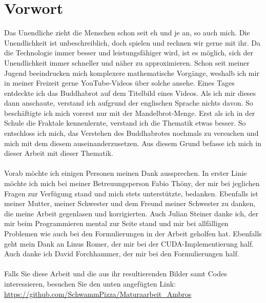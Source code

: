 \section*{Vorwort}
Das Unendliche zieht die Menschen schon seit eh und je an, so auch mich. Die Unendlichkeit ist unbeschreiblich, doch spielen und rechnen wir gerne mit ihr. Da die Technologie immer besser und leistungsfähiger wird, ist es möglich, sich der Unendlichkeit immer schneller und näher zu approximieren. Schon seit meiner Jugend beeindrucken mich komplexere mathematische Vorgänge, weshalb ich mir in meiner Freizeit gerne YouTube-Videos über solche ansehe. Eines Tages entdeckte ich das Buddhabrot auf dem Titelbild eines Videos. Als ich mir dieses dann anschaute, verstand ich aufgrund der englischen Sprache nichts davon. So beschäftigte ich mich vorerst nur mit der Mandelbrot-Menge. Erst als ich in der Schule die Fraktale kennenlernte, verstand ich die Thematik etwas besser. So entschloss ich mich, das Verstehen des Buddhabrotes nochmals zu versuchen und mich mit dem diesem auseinanderzusetzen. Aus diesem Grund befasse ich mich in dieser Arbeit mit dieser Thematik.\\
\\
Vorab möchte ich einigen Personen meinen Dank aussprechen. In erster Linie möchte ich mich bei meiner Betreuungsperson Fabio Thöny, der mir bei jeglichen Fragen zur Verfügung stand und mich stets unterstützte, bedanken. Ebenfalls ist meiner Mutter, meiner Schwester und dem Freund meiner Schwester zu danken, die meine Arbeit gegenlasen und korrigierten. Auch Julian Steiner danke ich, der mir beim Programmieren mental zur Seite stand und mir bei allfälligen Problemen wie auch bei den Formulierungen in der Arbeit geholfen hat. Ebenfalls geht mein Dank an Linus Romer, der mir bei der CUDA-Implementierung half. Auch danke ich David Forchhammer, der mir bei den Formulierungen half.\\
\\
Falls Sie diese Arbeit und die aus ihr resultierenden Bilder samt Codes interessieren, besuchen Sie den unten angefügten Link:\\ 
\url{https://github.com/SchwammPizza/Maturaarbeit_Ambros}